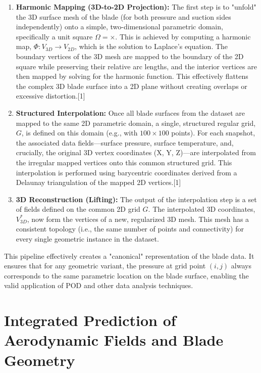 \documentclass[12pt, a4paper]{report}
\begin{document}
\begin{enumerate}
    \item \textbf{Harmonic Mapping (3D-to-2D Projection):} The first step is to "unfold" the 3D surface mesh of the blade (for both pressure and suction sides independently) onto a simple, two-dimensional parametric domain, specifically a unit square $\Omega =  \times $. This is achieved by computing a harmonic map, $\Phi: V_{3D} \rightarrow V_{2D}$, which is the solution to Laplace's equation. The boundary vertices of the 3D mesh are mapped to the boundary of the 2D square while preserving their relative arc lengths, and the interior vertices are then mapped by solving for the harmonic function. This effectively flattens the complex 3D blade surface into a 2D plane without creating overlaps or excessive distortion.[1]
    \item \textbf{Structured Interpolation:} Once all blade surfaces from the dataset are mapped to the same 2D parametric domain, a single, structured regular grid, $G$, is defined on this domain (e.g., with $100 \times 100$ points). For each snapshot, the associated data fields—surface pressure, surface temperature, and, crucially, the original 3D vertex coordinates (X, Y, Z)—are interpolated from the irregular mapped vertices onto this common structured grid. This interpolation is performed using barycentric coordinates derived from a Delaunay triangulation of the mapped 2D vertices.[1]
    \item \textbf{3D Reconstruction (Lifting):} The output of the interpolation step is a set of fields defined on the common 2D grid $G$. The interpolated 3D coordinates, $V_{3D}^*$, now form the vertices of a new, regularized 3D mesh. This mesh has a consistent topology (i.e., the same number of points and connectivity) for every single geometric instance in the dataset.
\end{enumerate}

This pipeline effectively creates a "canonical" representation of the blade data. It ensures that for any geometric variant, the pressure at grid point $(i, j)$ always corresponds to the same parametric location on the blade surface, enabling the valid application of POD and other data analysis techniques.

\section{Integrated Prediction of Aerodynamic Fields and Blade Geometry}
\end{document}
